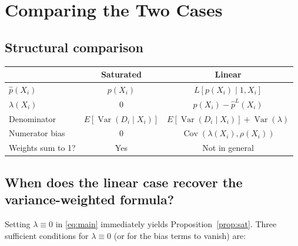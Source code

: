 \documentclass[11pt]{article}
\theoremstyle{remark}
\begin{document}
\section{Comparing the Two Cases}

\subsection{Structural comparison}

\begin{center}
\begin{tabular}{lcc}
  \toprule
  & \textbf{Saturated} & \textbf{Linear} \\
  \midrule
  $\hat p(X_i)$ & $p(X_i)$ & $L[p(X_i)\mid 1,X_i]$ \\
  $\lambda(X_i)$ & $0$ & $p(X_i)-\hat p^L(X_i)$ \\[3pt]
  Denominator & $E[\operatorname{Var}(D_i\mid X_i)]$
              & $E[\operatorname{Var}(D_i\mid X_i)] + \operatorname{Var}(\lambda)$ \\[3pt]
  Numerator bias & $0$
                 & $\operatorname{Cov}(\lambda(X_i),\rho(X_i))$ \\[3pt]
  Weights sum to 1? & Yes & Not in general \\
  \bottomrule
\end{tabular}
\end{center}

\subsection{When does the linear case recover the variance-weighted formula?}

Setting $\lambda \equiv 0$ in \eqref{eq:main} immediately yields Proposition~\ref{prop:sat}.
Three sufficient conditions for $\lambda \equiv 0$ (or for the bias terms to vanish) are:
\end{document}
